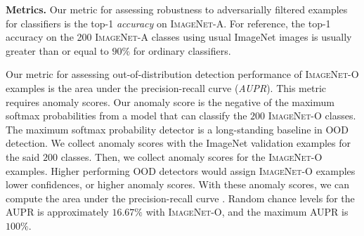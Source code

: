 \documentclass[10pt,twocolumn,letterpaper]{article}
\begin{document}
\noindent\textbf{Metrics.} Our metric for assessing robustness to adversarially filtered examples for classifiers is the top-1 \emph{accuracy} on \textsc{ImageNet-A}. For reference, the top-1 accuracy on the 200 \textsc{ImageNet-A} classes using usual ImageNet images is usually greater than or equal to $90\%$ for ordinary classifiers.

Our metric for assessing out-of-distribution detection performance of \textsc{ImageNet-O} examples is the area under the precision-recall curve (\emph{AUPR}). This metric requires anomaly scores. Our anomaly score is the negative of the maximum softmax probabilities \cite{hendrycks17baseline} from a model that can classify the $200$ \textsc{ImageNet-O} classes. The maximum softmax probability detector is a long-standing baseline in OOD detection. We collect anomaly scores with the ImageNet validation examples for the said $200$ classes.
Then, we collect anomaly scores for the \textsc{ImageNet-O} examples. Higher performing OOD detectors would assign \textsc{ImageNet-O} examples lower confidences, or higher anomaly scores. With these anomaly scores, we can compute the area under the precision-recall curve \cite{auprbaseline}. Random chance levels for the AUPR is approximately $16.67\%$ with \textsc{ImageNet-O}, and the maximum AUPR is $100\%$.
\end{document}
